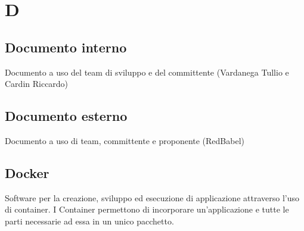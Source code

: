 \section*{D}
\subsection*{Documento interno
 }
Documento a uso del team di sviluppo e del committente (Vardanega Tullio e Cardin Riccardo)

\subsection*{Documento esterno
}
Documento a uso di team, committente e proponente (RedBabel)

\subsection*{Docker}
Software per la creazione, sviluppo ed esecuzione di applicazione attraverso l’uso di container. I Container permettono di incorporare un’applicazione e tutte le parti necessarie  ad essa in un unico pacchetto. 














